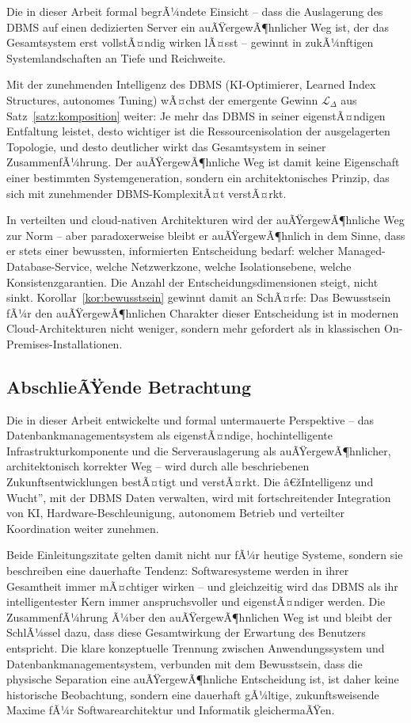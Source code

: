 ﻿\documentclass[a4paper,12pt]{article}
\theoremstyle{definition}
\begin{document}
Die in dieser Arbeit formal begrÃ¼ndete Einsicht -- dass die Auslagerung des DBMS auf einen dedizierten Server ein auÃŸergewÃ¶hnlicher Weg ist, der das Gesamtsystem erst vollstÃ¤ndig wirken lÃ¤sst -- gewinnt in zukÃ¼nftigen Systemlandschaften an Tiefe und Reichweite.

Mit der zunehmenden Intelligenz des DBMS (KI-Optimierer, Learned Index Structures, autonomes Tuning) wÃ¤chst der emergente Gewinn $\mathcal{L}_\Delta$ aus Satz~\ref{satz:komposition} weiter: Je mehr das DBMS in seiner eigenstÃ¤ndigen Entfaltung leistet, desto wichtiger ist die Ressourcenisolation der ausgelagerten Topologie, und desto deutlicher wirkt das Gesamtsystem in seiner ZusammenfÃ¼hrung. Der auÃŸergewÃ¶hnliche Weg ist damit keine Eigenschaft einer bestimmten Systemgeneration, sondern ein architektonisches Prinzip, das sich mit zunehmender DBMS-KomplexitÃ¤t verstÃ¤rkt.

In verteilten und cloud-nativen Architekturen wird der auÃŸergewÃ¶hnliche Weg zur Norm -- aber paradoxerweise bleibt er auÃŸergewÃ¶hnlich in dem Sinne, dass er stets einer bewussten, informierten Entscheidung bedarf: welcher Managed-Database-Service, welche Netzwerkzone, welche Isolationsebene, welche Konsistenzgarantien. Die Anzahl der Entscheidungsdimensionen steigt, nicht sinkt. Korollar~\ref{kor:bewusstsein} gewinnt damit an SchÃ¤rfe: Das Bewusstsein fÃ¼r den auÃŸergewÃ¶hnlichen Charakter dieser Entscheidung ist in modernen Cloud-Architekturen nicht weniger, sondern mehr gefordert als in klassischen On-Premises-Installationen.

\subsection{AbschlieÃŸende Betrachtung}

Die in dieser Arbeit entwickelte und formal untermauerte Perspektive -- das Datenbankmanagementsystem als eigenstÃ¤ndige, hochintelligente Infrastrukturkomponente und die Serverauslagerung als auÃŸergewÃ¶hnlicher, architektonisch korrekter Weg -- wird durch alle beschriebenen Zukunftsentwicklungen bestÃ¤tigt und verstÃ¤rkt. Die â€žIntelligenz und Wucht'', mit der DBMS Daten verwalten, wird mit fortschreitender Integration von KI, Hardware-Beschleunigung, autonomem Betrieb und verteilter Koordination weiter zunehmen.

Beide Einleitungszitate gelten damit nicht nur fÃ¼r heutige Systeme, sondern sie beschreiben eine dauerhafte Tendenz: Softwaresysteme werden in ihrer Gesamtheit immer mÃ¤chtiger wirken -- und gleichzeitig wird das DBMS als ihr intelligentester Kern immer anspruchsvoller und eigenstÃ¤ndiger werden. Die ZusammenfÃ¼hrung Ã¼ber den auÃŸergewÃ¶hnlichen Weg ist und bleibt der SchlÃ¼ssel dazu, dass diese Gesamtwirkung der Erwartung des Benutzers entspricht. Die klare konzeptuelle Trennung zwischen Anwendungssystem und Datenbankmanagementsystem, verbunden mit dem Bewusstsein, dass die physische Separation eine auÃŸergewÃ¶hnliche Entscheidung ist, ist daher keine historische Beobachtung, sondern eine dauerhaft gÃ¼ltige, zukunftsweisende Maxime fÃ¼r Softwarearchitektur und Informatik gleichermaÃŸen.
\end{document}
